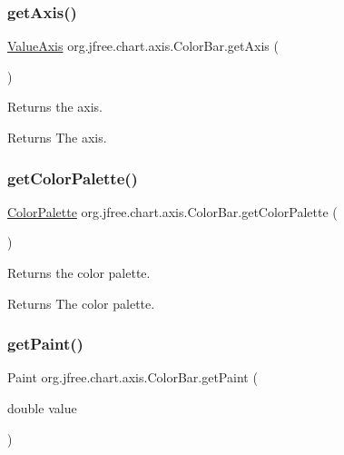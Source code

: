 \subsubsection{\texorpdfstring{get\+Axis()}{getAxis()}}
{\footnotesize\ttfamily \mbox{\hyperlink{classorg_1_1jfree_1_1chart_1_1axis_1_1_value_axis}{Value\+Axis}} org.\+jfree.\+chart.\+axis.\+Color\+Bar.\+get\+Axis (\begin{DoxyParamCaption}{ }\end{DoxyParamCaption})}

Returns the axis.

\begin{DoxyReturn}{Returns}
The axis. 
\end{DoxyReturn}
\mbox{\label{classorg_1_1jfree_1_1chart_1_1axis_1_1_color_bar_a6e29af1d1ea42b066fb5e0123541eac0}} 
\subsubsection{\texorpdfstring{get\+Color\+Palette()}{getColorPalette()}}
{\footnotesize\ttfamily \mbox{\hyperlink{classorg_1_1jfree_1_1chart_1_1plot_1_1_color_palette}{Color\+Palette}} org.\+jfree.\+chart.\+axis.\+Color\+Bar.\+get\+Color\+Palette (\begin{DoxyParamCaption}{ }\end{DoxyParamCaption})}

Returns the color palette.

\begin{DoxyReturn}{Returns}
The color palette. 
\end{DoxyReturn}
\mbox{\label{classorg_1_1jfree_1_1chart_1_1axis_1_1_color_bar_afe92537a6910ae2a2615008410779875}} 
\subsubsection{\texorpdfstring{get\+Paint()}{getPaint()}}
{\footnotesize\ttfamily Paint org.\+jfree.\+chart.\+axis.\+Color\+Bar.\+get\+Paint (\begin{DoxyParamCaption}\item[{double}]{value }\end{DoxyParamCaption})}

